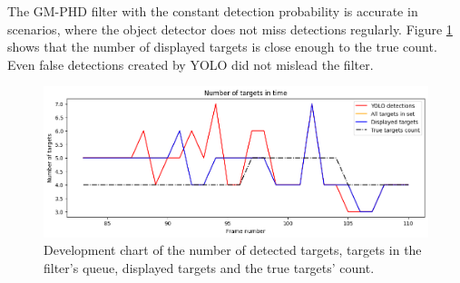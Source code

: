 The GM-PHD filter with the constant detection probability is accurate in scenarios, where the object detector does not
miss detections regularly. Figure \ref{gr:E1-V2-S0} shows that the number of displayed targets is close enough
to the true count. Even false detections created by YOLO did not mislead the filter.


\begin{figure}[H]
    \centering
    \includegraphics[width=\linewidth]{../../../experiments/E1/V2/noPd/staticPd_det}
    \caption{Development chart of the number of detected targets, targets in the filter's queue, displayed targets
    and the
    true
    targets' count.}
    \label{gr:E1-V2-S0}
\end{figure}

